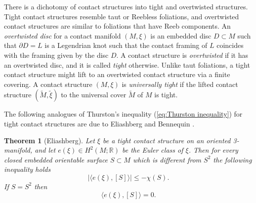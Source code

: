 \documentclass[11pt]{amsart}
\newtheorem{thm}{Theorem}[section]
\theoremstyle{remark}
\theoremstyle{definition}
\begin{document}
	There is a dichotomy of contact structures into tight and overtwisted structures. Tight contact structures resemble taut or Reebless foliations, and overtwisted contact structures are similar to foliations that have Reeb components.  An \emph{overtwisted disc} for a contact manifold $(M, \xi)$ is an embedded disc $D \subset M$ such that $\partial D = L$ is a Legendrian knot such that the contact framing of $L$ coincides with the framing given by the disc $D$. A contact structure is \emph{overtwisted} if it has an overtwisted disc, and it is called \emph{tight} otherwise. Unlike taut foliations, a tight contact structure might lift to an overtwisted contact structure via a finite covering. A contact structure $(M , \xi)$ is \emph{universally tight} if the lifted contact structure $(\tilde{M}, \tilde{\xi})$ to the universal cover $\tilde{M}$ of $M$ is tight. 
	
	 The following analogues of Thurston's inequality (\ref{eq:Thurston inequality}) for tight contact structures are due to Eliashberg \cite{eliashberg1992contact} and Bennequin \cite{bennequin1982entrelacements}. 
	
	\begin{thm}[Eliashberg]
		Let $\xi$ be a tight contact structure on an oriented 3-manifold, and let $e(\xi) \in H^2(M ; \mathbb{R})$ be the Euler class of $\xi$. Then for every closed embedded orientable surface $S \subset M$ which is different from $S^2$ the following inequality holds 
		\[ | \langle e(\xi) , [S] \rangle | \leq - \chi(S). \]
		If $S = S^2$ then 
		\[  \langle e(\xi) , [S] \rangle  = 0 . \]
		\label{thm:eliashberg-inequality}
	\end{thm}
\end{document}
